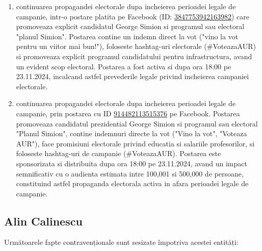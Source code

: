 \documentclass[a4paper,12pt]{article}
\begin{document}
\begin{enumerate}[leftmargin=*, label=\arabic*.)]
    \item continuarea propagandei electorale dupa incheierea perioadei legale de campanie, intr-o postare platita pe Facebook (ID: \href{https://www.facebook.com/ads/library/?id=3847753942163982}{3847753942163982}) care promoveaza explicit candidatul George Simion si programul sau electoral "planul Simion". Postarea contine un indemn direct la vot ("vino la vot pentru un viitor mai bun!"), foloseste hashtag-uri electorale (\#VoteazaAUR) si promoveaza explicit programul candidatului pentru infrastructura, avand un evident scop electoral. Postarea a fost activa si dupa ora 18:00 pe 23.11.2024, incalcand astfel prevederile legale privind incheierea campaniei electorale.
    \item continuarea propagandei electorale dupa incheierea perioadei legale de campanie, prin postarea cu ID \href{https://www.facebook.com/ads/library/?id=914482113515376}{914482113515376} pe Facebook. Postarea promoveaza candidatul prezidential George Simion si programul sau electoral "Planul Simion", contine indemnuri directe la vot ("Vino la vot", "Voteaza AUR"), face promisiuni electorale privind educatia si salariile profesorilor, si foloseste hashtag-uri de campanie (\#VoteazaAUR). Postarea este sponsorizata si distribuita dupa ora 18:00 pe 23.11.2024, avand un impact semnificativ cu o audienta estimata intre 100,001 si 500,000 de persoane, constituind astfel propaganda electorala activa in afara perioadei legale de campanie.
\end{enumerate}

\vspace{0.5cm}

\subsection{Alin Calinescu}
Următoarele fapte contravenționale sunt sesizate împotriva acestei entități:
\end{document}
